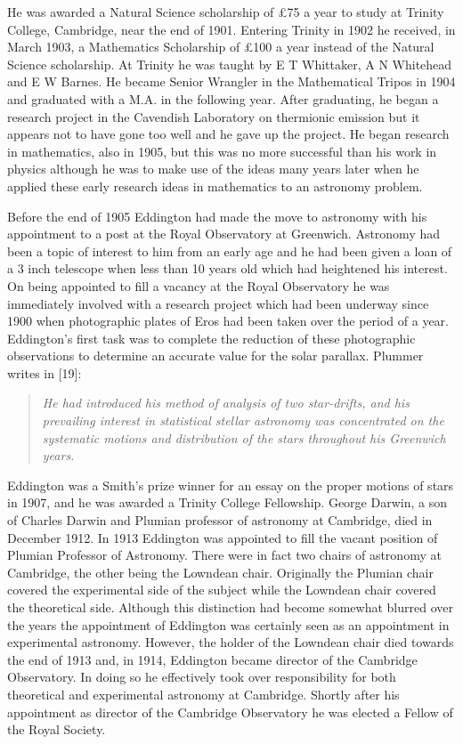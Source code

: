 He was awarded a Natural Science scholarship of £75 a year to study at Trinity College, Cambridge, near the end of 1901. Entering Trinity in 1902 he received, in March 1903, a Mathematics Scholarship of £100 a year instead of the Natural Science scholarship. At Trinity he was taught by E T Whittaker, A N Whitehead and E W Barnes. He became Senior Wrangler in the Mathematical Tripos in 1904 and graduated with a M.A. in the following year. After graduating, he began a research project in the Cavendish Laboratory on thermionic emission but it appears not to have gone too well and he gave up the project. He began research in mathematics, also in 1905, but this was no more successful than his work in physics although he was to make use of the ideas many years later when he applied these early research ideas in mathematics to an astronomy problem.

Before the end of 1905 Eddington had made the move to astronomy with his appointment to a post at the Royal Observatory at Greenwich. Astronomy had been a topic of interest to him from an early age and he had been given a loan of a 3 inch telescope when less than 10 years old which had heightened his interest. On being appointed to fill a vacancy at the Royal Observatory he was immediately involved with a research project which had been underway since 1900 when photographic plates of Eros had been taken over the period of a year. Eddington's first task was to complete the reduction of these photographic observations to determine an accurate value for the solar parallax. Plummer writes in [19]:
\begin{quote}
\textit{He had introduced his method of analysis of two star-drifts, and his prevailing interest in statistical stellar astronomy was concentrated on the systematic motions and distribution of the stars throughout his Greenwich years.}
\end{quote}

Eddington was a Smith's prize winner for an essay on the proper motions of stars in 1907, and he was awarded a Trinity College Fellowship. George Darwin, a son of Charles Darwin and Plumian professor of astronomy at Cambridge, died in December 1912. In 1913 Eddington was appointed to fill the vacant position of Plumian Professor of Astronomy. There were in fact two chairs of astronomy at Cambridge, the other being the Lowndean chair. Originally the Plumian chair covered the experimental side of the subject while the Lowndean chair covered the theoretical side. Although this distinction had become somewhat blurred over the years the appointment of Eddington was certainly seen as an appointment in experimental astronomy. However, the holder of the Lowndean chair died towards the end of 1913 and, in 1914, Eddington became director of the Cambridge Observatory. In doing so he effectively took over responsibility for both theoretical and experimental astronomy at Cambridge. Shortly after his appointment as director of the Cambridge Observatory he was elected a Fellow of the Royal Society.

